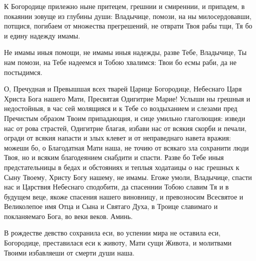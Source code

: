 
\vspace{-\baselineskip} 



К Богородице прилежно ныне притецем, грешнии и смиреннии, и припадем, в покаянии зовуще из глубины души: Владычице, помози, на ны милосердовавши, потщися, погибаем от множества прегрешений, не отврати Твоя рабы тщи, Тя бо и едину надежду имамы.





Не имамы иныя помощи, не имамы иныя надежды, разве Тебе, Владычице, Ты нам помози, на Тебе надеемся и Тобою хвалимся: Твои бо есмы раби, да не постыдимся.




О, Пречудная и Превышшая всех тварей Царице Богородице, Небеснаго Царя Христа Бога нашего Мати, Пресвятая Одигитрие Марие! Услыши ны грешныя и недостойныя, в час сей молящияся и к Тебе со воздыханием и слезами пред Пречистым образом Твоим припадающия, и сице умильно глаголющия: изведи нас от рова страстей, Одигитрие благая, избави нас от всякия скорби и печали, огради от всякия напасти и злых клевет и от неправеднаго навета вражия: можеши бо, о Благодатная Мати наша, не точию от всякаго зла сохранити люди Твоя, но и всяким благодеянием снабдити и спасти. Разве бо Тебе иныя предстательницы в бедах и обстояниях и теплыя ходатаицы о нас грешных к Сыну Твоему, Христу Богу нашему, не имамы. Егоже умоли, Владычице, спасти нас и Царствия Небеснаго сподобити, да спасеннии Тобою славим Тя и в будущем веце, якоже спасения нашего виновницу, и превозносим Всесвятое и Великолепое имя Отца и Сына и Святаго Духа, в Троице славимаго и покланяемаго Бога, во веки веков. Аминь.
\longpage{}\mychapterending

 




В рождестве девство сохранила еси, во успении мира не оставила еси, Богородице, преставилася еси к животу, Мати сущи Живота, и молитвами Твоими избавляеши от смерти души наша.


